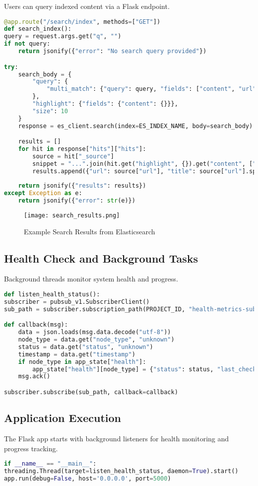 \documentclass[12pt,a4paper]{report}
\begin{document}
Users can query indexed content via a Flask endpoint.
\begin{lstlisting}[language=Python]
@app.route("/search/index", methods=["GET"])
def search_index():
query = request.args.get("q", "")
if not query:
    return jsonify({"error": "No search query provided"})

try:
    search_body = {
        "query": {
            "multi_match": {"query": query, "fields": ["content", "url"]}
        },
        "highlight": {"fields": {"content": {}}},
        "size": 10
    }
    response = es_client.search(index=ES_INDEX_NAME, body=search_body)

    results = []
    for hit in response["hits"]["hits"]:
        source = hit["_source"]
        snippet = "...".join(hit.get("highlight", {}).get("content", ["No preview available"]))
        results.append({"url": source["url"], "title": source["url"].split("/")[-1], "snippet": snippet})
    
    return jsonify({"results": results})
except Exception as e:
    return jsonify({"error": str(e)})
\end{lstlisting}

\begin{figure}[htb!]
    \centering
    \texttt{[image: search\_results.png]}
    \caption{Example Search Results from Elasticsearch}
    \label{fig:search-results}
\end{figure}
\newpage
\subsection{Health Check and Background Tasks}
Background threads monitor system health and progress.
\begin{lstlisting}[language=Python]
def listen_health_status():
subscriber = pubsub_v1.SubscriberClient()
sub_path = subscriber.subscription_path(PROJECT_ID, "health-metrics-sub")

def callback(msg):
    data = json.loads(msg.data.decode("utf-8"))
    node_type = data.get("node_type", "unknown")
    status = data.get("status", "unknown")
    timestamp = data.get("timestamp")
    if node_type in app_state["health"]:
        app_state["health"][node_type] = {"status": status, "last_check": timestamp}
    msg.ack()

subscriber.subscribe(sub_path, callback=callback)
\end{lstlisting}

\subsection{Application Execution}
The Flask app starts with background listeners for health monitoring and progress tracking.
\begin{lstlisting}[language=Python]
if __name__ == "__main__":
threading.Thread(target=listen_health_status, daemon=True).start()
app.run(debug=False, host='0.0.0.0', port=5000)
\end{lstlisting}
\end{document}
